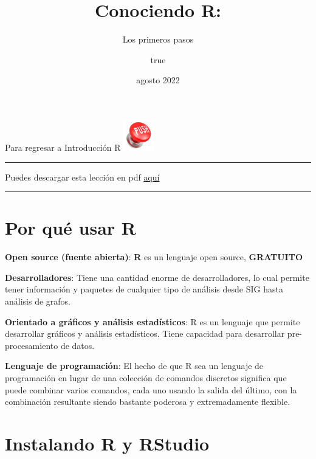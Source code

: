 \documentclass[
]{article}
\title{Conociendo R:}
\subtitle{Los primeros pasos}
\author{true}
\date{agosto 2022}
\begin{document}
\maketitle

{
\setcounter{tocdepth}{2}
\tableofcontents
}
Para regresar a Introducción R
\href{https://ciespinosa.github.io/IntroduccionR}{\includegraphics{push1.png}}

\begin{center}\rule{0.5\linewidth}{0.5pt}\end{center}

Puedes descargar esta lección en pdf
\href{https://ciespinosa.github.io/ConociendoR/index.pdf}{aquí}

\begin{center}\rule{0.5\linewidth}{0.5pt}\end{center}

\hypertarget{por-quuxe9-usar-r}{%
\section{Por qué usar R}\label{por-quuxe9-usar-r}}

\textbf{Open source (fuente abierta)}: \textbf{R} es un lenguaje open
source, { \textbf{GRATUITO} }

\textbf{Desarrolladores}: Tiene una cantidad enorme de desarrolladores,
lo cual permite tener información y paquetes de cualquier tipo de
análisis desde SIG hasta análisis de grafos.

\textbf{Orientado a gráficos y análisis estadísticos}: R es un lenguaje
que permite desarrollar gráficos y análisis estadísticos. Tiene
capacidad para desarrollar pre-procesamiento de datos.

\textbf{Lenguaje de programación}: El hecho de que R sea un lenguaje de
programación en lugar de una colección de comandos discretos significa
que puede combinar varios comandos, cada uno usando la salida del
último, con la combinación resultante siendo bastante poderosa y
extremadamente flexible.

\hypertarget{instalando-r-y-rstudio}{%
\section{Instalando R y RStudio}\label{instalando-r-y-rstudio}}
\end{document}
